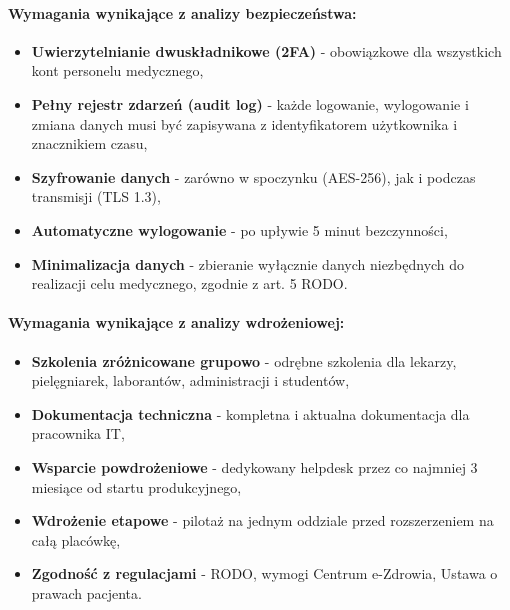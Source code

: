 \paragraph{Wymagania wynikające z analizy bezpieczeństwa:}
\begin{itemize}
    \item \textbf{Uwierzytelnianie dwuskładnikowe (2FA)} - obowiązkowe dla wszystkich kont personelu medycznego,
    \item \textbf{Pełny rejestr zdarzeń (audit log)} - każde logowanie, wylogowanie i zmiana danych musi być zapisywana z identyfikatorem użytkownika i znacznikiem czasu,
    \item \textbf{Szyfrowanie danych} - zarówno w spoczynku (AES-256), jak i podczas transmisji (TLS 1.3),
    \item \textbf{Automatyczne wylogowanie} - po upływie 5 minut bezczynności,
    \item \textbf{Minimalizacja danych} - zbieranie wyłącznie danych niezbędnych do realizacji celu medycznego, zgodnie z art. 5 RODO.
\end{itemize}

\paragraph{Wymagania wynikające z analizy wdrożeniowej:}
\begin{itemize}
    \item \textbf{Szkolenia zróżnicowane grupowo} - odrębne szkolenia dla lekarzy, pielęgniarek, laborantów, administracji i studentów,
    \item \textbf{Dokumentacja techniczna} - kompletna i aktualna dokumentacja dla pracownika IT,
    \item \textbf{Wsparcie powdrożeniowe} - dedykowany helpdesk przez co najmniej 3 miesiące od startu produkcyjnego,
    \item \textbf{Wdrożenie etapowe} - pilotaż na jednym oddziale przed rozszerzeniem na całą placówkę,
    \item \textbf{Zgodność z regulacjami} - RODO, wymogi Centrum e-Zdrowia, Ustawa o prawach pacjenta.
\end{itemize}
